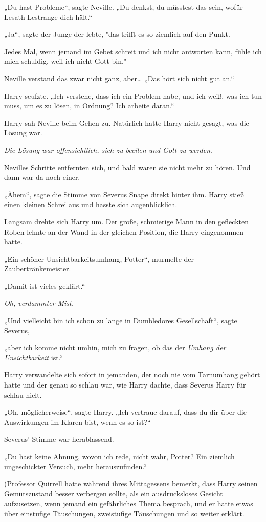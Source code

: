 {„Du hast Probleme“, sagte Neville. „Du denkst, du müsstest das sein, wofür Lesath Lestrange dich hält.“

„Ja“, sagte der Junge-der-lebte, "das trifft es so ziemlich auf den Punkt.

Jedes Mal, wenn jemand im Gebet schreit und ich nicht antworten kann, fühle ich mich schuldig, weil ich nicht Gott bin."

Neville verstand das zwar nicht ganz, aber… „Das hört sich nicht gut an.“

Harry seufzte. „Ich verstehe, dass ich ein Problem habe, und ich weiß, was ich tun muss, um es zu lösen, in Ordnung? Ich arbeite daran.“

Harry sah Neville beim Gehen zu. Natürlich hatte Harry nicht gesagt, was die Lösung war.

\emph{Die Lösung war offensichtlich, sich zu beeilen und Gott zu werden}.

Nevilles Schritte entfernten sich, und bald waren sie nicht mehr zu hören. Und dann war da noch einer.

„Ähem“, sagte die Stimme von Severus Snape direkt hinter ihm. Harry stieß einen kleinen Schrei aus und hasste sich augenblicklich.

Langsam drehte sich Harry um. Der große, schmierige Mann in den gefleckten Roben lehnte an der Wand in der gleichen Position, die Harry eingenommen hatte.

„Ein schöner Unsichtbarkeitsumhang, Potter“, murmelte der Zaubertränkemeister.

„Damit ist vieles geklärt.“

\emph{Oh, verdammter Mist.}

„Und vielleicht bin ich schon zu lange in Dumbledores Gesellschaft“, sagte Severus,

„aber ich komme nicht umhin, mich zu fragen, ob das der \emph{Umhang der Unsichtbarkeit} ist.“

Harry verwandelte sich sofort in jemanden, der noch nie vom Tarnumhang gehört hatte und der genau so schlau war, wie Harry dachte, dass Severus Harry für schlau hielt.

„Oh, möglicherweise“, sagte Harry. „Ich vertraue darauf, dass du dir über die Auswirkungen im Klaren bist, wenn es so ist?“

Severus' Stimme war herablassend.

„Du hast keine Ahnung, wovon ich rede, nicht wahr, Potter? Ein ziemlich ungeschickter Versuch, mehr herauszufinden.“

(Professor Quirrell hatte während ihres Mittagessens bemerkt, dass Harry seinen Gemütszustand besser verbergen sollte, als ein ausdrucksloses Gesicht aufzusetzen, wenn jemand ein gefährliches Thema besprach, und er hatte etwas über einstufige Täuschungen, zweistufige Täuschungen und so weiter erklärt.

}
